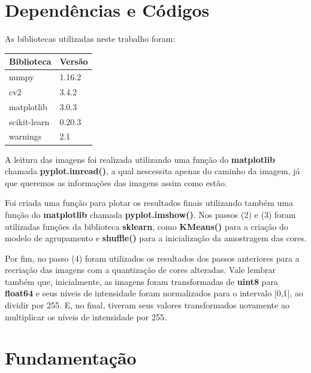 \documentclass[twoside,twocolumn]{article}
\begin{document}
\section{Dependências e Códigos}

As bibliotecas utilizadas neste trabalho foram:

\begin{table}[H]
\begin{center}
\begin{tabular}{|l|l|}
\hline
\textbf{Biblioteca} & \textbf{Versão} \\ \hline
numpy               & 1.16.2          \\ \hline
cv2                 & 3.4.2           \\ \hline
matplotlib          & 3.0.3           \\ \hline
scikit-learn        & 0.20.3	      \\ \hline
warnings            & 2.1             \\ \hline
\end{tabular}
\end{center}
\end{table}

A leitura das imagens foi realizada utilizando uma função do \textbf{matplotlib} \cite{b3} chamada \textbf{pyplot.imread()}, a qual nescessita apenas do caminho da imagem, já que queremos as informações das imagens assim como estão.

Foi criada uma função para plotar os resultados finais utilizando também uma função do \textbf{matplotlib} chamada \textbf{pyplot.imshow()}. Nos passos (2) e (3) foram utilizadas funções da biblioteca \textbf{sklearn}, como \textbf{KMeans()} para a criação do modelo de agrupamento e \textbf{shuffle()} para a inicialização da amostragem das cores.

Por fim, no passo (4) foram utilizados os resultados dos passos anteriores para a recriação das imagens com a quantização de cores alteradas. Vale lembrar também que, inicialmente, as imagens foram transformadas de \textbf{uint8} para \textbf{float64} e seus níveis de intensidade foram normalizados para o intervalo [0,1], ao dividir por 255. E, no final, tiveram seus valores transformados novamente ao multiplicar os níveis de intensidade por 255.


\section{Fundamentação}
\end{document}
